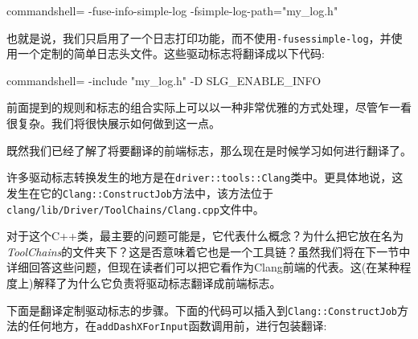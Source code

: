 \begin{itemize}
\begin{tcblisting}{commandshell={}}
-fuse-info-simple-log -fsimple-log-path="my_log.h"
\end{tcblisting}

也就是说，我们只启用了一个日志打印功能，而不使用\texttt{-fusessimple-log}，并使用一个定制的简单日志头文件。这些驱动标志将翻译成以下代码:

\begin{tcblisting}{commandshell={}}
-include "my_log.h" -D SLG_ENABLE_INFO
\end{tcblisting}

前面提到的规则和标志的组合实际上可以以一种非常优雅的方式处理，尽管乍一看很复杂。我们将很快展示如何做到这一点。

\end{itemize}

既然我们已经了解了将要翻译的前端标志，那么现在是时候学习如何进行翻译了。

许多驱动标志转换发生的地方是在\texttt{driver::tools::Clang}类中。更具体地说，这发生在它的\texttt{Clang::ConstructJob}方法中，该方法位于\texttt{clang/lib/Driver/ToolChains/Clang.cpp}文件中。

\begin{tcolorbox}[colback=blue!5!white,colframe=blue!75!black, fonttitle=\bfseries,title=关于\texttt{driver::tools::Clang}]	
\hspace*{0.7cm}对于这个C++类，最主要的问题可能是，它代表什么概念？为什么把它放在名为\textit{ToolChains}的文件夹下？这是否意味着它也是一个工具链？虽然我们将在下一节中详细回答这些问题，但现在读者们可以把它看作为Clang前端的代表。这(在某种程度上)解释了为什么它负责将驱动标志翻译成前端标志。
\end{tcolorbox}

下面是翻译定制驱动标志的步骤。下面的代码可以插入到\texttt{Clang::ConstructJob}方法的任何地方，在\texttt{addDashXForInput}函数调用前，进行包装翻译:


